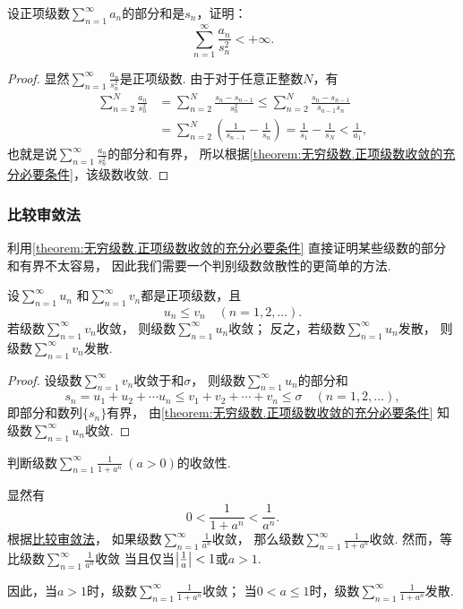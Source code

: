 \begin{example}
设正项级数\(\sum_{n=1}^\infty a_n\)的部分和是\(s_n\)，证明：\[
	\sum_{n=1}^\infty \frac{a_n}{s_n^2} < +\infty.
\]
\begin{proof}
显然\(\sum_{n=1}^\infty \frac{a_n}{s_n^2}\)是正项级数.
由于对于任意正整数\(N\)，有\begin{align*}
	\sum_{n=2}^N \frac{a_n}{s_n^2}
	&= \sum_{n=2}^N \frac{s_n-s_{n-1}}{s_n^2}
	\leq \sum_{n=2}^N \frac{s_n-s_{n-1}}{s_{n-1} s_n} \\
	&= \sum_{n=2}^N \left(
			\frac{1}{s_{n-1}} - \frac{1}{s_n}
		\right)
	= \frac{1}{s_1} - \frac{1}{s_N}
	< \frac{1}{a_1},
\end{align*}
也就是说\(\sum_{n=1}^\infty \frac{a_n}{s_n^2}\)的部分和有界，
所以根据\cref{theorem:无穷级数.正项级数收敛的充分必要条件}，该级数收敛.
\end{proof}
\end{example}

\subsubsection{比较审敛法}
利用\cref{theorem:无穷级数.正项级数收敛的充分必要条件} 直接证明某些级数的部分和有界不太容易，
因此我们需要一个判别级数敛散性的更简单的方法.

\begin{theorem}[比较审敛法]\label{theorem:无穷级数.正项级数的比较审敛法}
设\(\sum_{n=1}^\infty u_n\)
和\(\sum_{n=1}^\infty v_n\)都是正项级数，且\[
	u_n \leq v_n
	\quad(n=1,2,\dotsc).
\]
若级数\(\sum_{n=1}^\infty v_n\)收敛，
则级数\(\sum_{n=1}^\infty u_n\)收敛；
反之，若级数\(\sum_{n=1}^\infty u_n\)发散，
则级数\(\sum_{n=1}^\infty v_n\)发散.
\begin{proof}
设级数\(\sum_{n=1}^\infty v_n\)收敛于和\(\sigma\)，
则级数\(\sum_{n=1}^\infty u_n\)的部分和\[
	s_n = u_1 + u_2 + \dotsb u_n
	\leq
	v_1 + v_2 + \dotsb + v_n \leq \sigma
	\quad(n=1,2,\dotsc),
\]
即部分和数列\(\{s_n\}\)有界，
由\cref{theorem:无穷级数.正项级数收敛的充分必要条件} 知级数\(\sum_{n=1}^\infty u_n\)收敛.
\end{proof}
\end{theorem}

\begin{example}
判断级数\(\sum_{n=1}^\infty \frac{1}{1+a^n}\ (a>0)\)的收敛性.
\begin{solution}
显然有\[
	0 < \frac{1}{1+a^n} < \frac{1}{a^n}.
\]
根据\hyperref[theorem:无穷级数.正项级数的比较审敛法]{比较审敛法}，
如果级数\(\sum_{n=1}^\infty \frac{1}{a^n}\)收敛，
那么级数\(\sum_{n=1}^\infty \frac{1}{1+a^n}\)收敛.
然而，等比级数\(\sum_{n=1}^\infty \frac{1}{a^n}\)收敛
当且仅当\(\abs{\frac{1}{a}} < 1\)或\(a > 1\).

因此，当\(a > 1\)时，级数\(\sum_{n=1}^\infty \frac{1}{1+a^n}\)收敛；
当\(0 < a \leq 1\)时，级数\(\sum_{n=1}^\infty \frac{1}{1+a^n}\)发散.
\end{solution}
\end{example}

